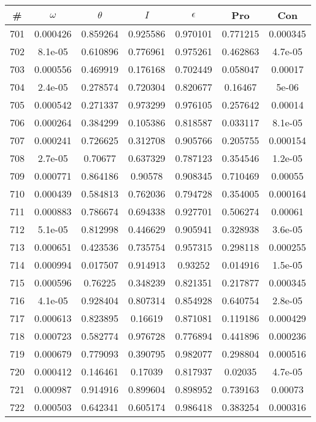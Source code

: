 \newpage
\begin{table}
\begin{tabular}{c|c|c|c|c|c|c}
\# & $\omega$ & $\theta$ & $I$ & $\epsilon$ & Pro & Con\\
\hline
701 & 0.000426 & 0.859264 & 0.925586 & 0.970101 & 0.771215 & 0.000345\\
702 & 8.1e-05 & 0.610896 & 0.776961 & 0.975261 & 0.462863 & 4.7e-05\\
703 & 0.000556 & 0.469919 & 0.176168 & 0.702449 & 0.058047 & 0.00017\\
704 & 2.4e-05 & 0.278574 & 0.720304 & 0.820677 & 0.16467 & 5e-06\\
705 & 0.000542 & 0.271337 & 0.973299 & 0.976105 & 0.257642 & 0.00014\\
706 & 0.000264 & 0.384299 & 0.105386 & 0.818587 & 0.033117 & 8.1e-05\\
707 & 0.000241 & 0.726625 & 0.312708 & 0.905766 & 0.205755 & 0.000154\\
708 & 2.7e-05 & 0.70677 & 0.637329 & 0.787123 & 0.354546 & 1.2e-05\\
709 & 0.000771 & 0.864186 & 0.90578 & 0.908345 & 0.710469 & 0.00055\\
710 & 0.000439 & 0.584813 & 0.762036 & 0.794728 & 0.354005 & 0.000164\\
711 & 0.000883 & 0.786674 & 0.694338 & 0.927701 & 0.506274 & 0.00061\\
712 & 5.1e-05 & 0.812998 & 0.446629 & 0.905941 & 0.328938 & 3.6e-05\\
713 & 0.000651 & 0.423536 & 0.735754 & 0.957315 & 0.298118 & 0.000255\\
714 & 0.000994 & 0.017507 & 0.914913 & 0.93252 & 0.014916 & 1.5e-05\\
715 & 0.000596 & 0.76225 & 0.348239 & 0.821351 & 0.217877 & 0.000345\\
716 & 4.1e-05 & 0.928404 & 0.807314 & 0.854928 & 0.640754 & 2.8e-05\\
717 & 0.000613 & 0.823895 & 0.16619 & 0.871081 & 0.119186 & 0.000429\\
718 & 0.000723 & 0.582774 & 0.976728 & 0.776894 & 0.441896 & 0.000236\\
719 & 0.000679 & 0.779093 & 0.390795 & 0.982077 & 0.298804 & 0.000516\\
720 & 0.000412 & 0.146461 & 0.17039 & 0.817937 & 0.02035 & 4.7e-05\\
721 & 0.000987 & 0.914916 & 0.899604 & 0.898952 & 0.739163 & 0.00073\\
722 & 0.000503 & 0.642341 & 0.605174 & 0.986418 & 0.383254 & 0.000316\\

\end{tabular}
\end{table}
